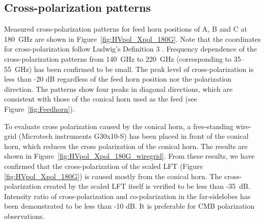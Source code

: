 \documentclass[journal]{IEEEtran}
\begin{document}
\subsection{Cross-polarization patterns}
%
Measured cross-polarization patterns for feed horn positions of A, B and C at 180~GHz are shown in Figure~\ref{fig:HVpol_Xpol_180G}.
Note that the coordinates for cross-polarization follow Ludwig's Definition 3 \cite{Ludwig1973}.
Frequency dependence of the cross-polarization patterns from 140~GHz to 220~GHz (corresponding to 35--55~GHz) has been confirmed to be small.
The peak level of cross-polarization is less than -20 dB regardless of the feed horn position nor the polarization direction. The patterns show four peaks in diagonal directions, which are consistent with those of the conical horn used as the feed (see Figure~\ref{fig:Feedhorn}).
\par
To evaluate cross polarization caused by the conical horn, a free-standing wire-grid (Microtech instruments G30x10-S) has been placed in front of the conical horn, which reduces the cross polarization of the conical horn.
The results are shown in Figure~\ref{fig:HVpol_Xpol_180G_wiregrid}. 
From these results, we have confirmed that the cross-polarization of the scaled LFT (Figure \ref{fig:HVpol_Xpol_180G}) is caused mostly from the conical horn.
The cross-polarization created by the scaled LFT itself is verified to be less than -35~dB.
Intensity ratio of cross-polarization and co-polarization in the far-sidelobes has been demonstrated to be less than -10 dB. It is preferable for CMB polarization observations.
%
\end{document}
